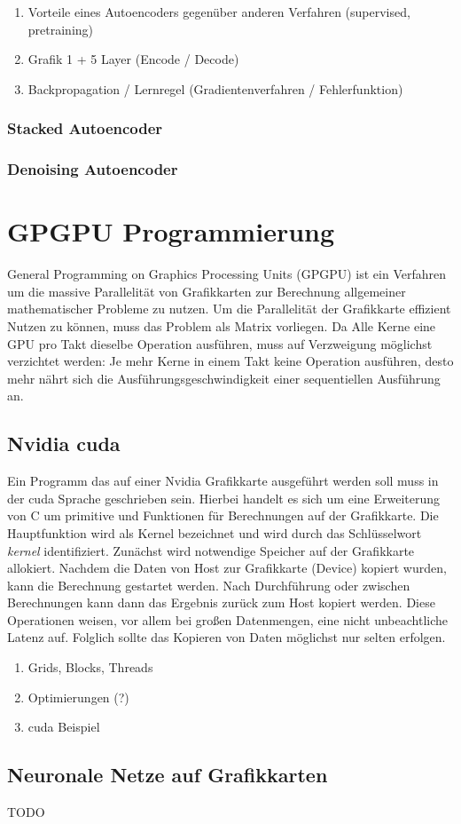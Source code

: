 \begin{enumerate}
	\item Vorteile eines Autoencoders gegenüber anderen Verfahren (supervised, pretraining)
	\item Grafik 1 + 5 Layer (Encode / Decode)
	\item Backpropagation / Lernregel (Gradientenverfahren / Fehlerfunktion)
\end{enumerate}

\cite{ssn1997}

\subsubsection{Stacked Autoencoder}

\subsubsection{Denoising Autoencoder}

\section{GPGPU Programmierung}

General Programming on Graphics Processing Units (GPGPU) ist ein Verfahren um die massive Parallelität von Grafikkarten zur Berechnung allgemeiner mathematischer Probleme zu nutzen. Um die Parallelität der Grafikkarte effizient Nutzen zu können, muss das Problem als Matrix vorliegen. Da Alle Kerne eine GPU pro Takt dieselbe Operation ausführen, muss auf Verzweigung möglichst verzichtet werden: Je mehr Kerne  in einem Takt keine Operation ausführen, desto mehr nährt sich die Ausführungsgeschwindigkeit einer sequentiellen Ausführung an.

\subsection{Nvidia cuda}

Ein Programm das auf einer Nvidia Grafikkarte ausgeführt werden soll muss in der cuda Sprache geschrieben sein. Hierbei handelt es sich um eine Erweiterung von C um primitive und Funktionen für Berechnungen auf der Grafikkarte. Die Hauptfunktion wird als Kernel bezeichnet und wird durch das Schlüsselwort \textit{\textunderscore\textunderscore kernel\textunderscore\textunderscore} identifiziert. Zunächst wird notwendige Speicher auf der Grafikkarte allokiert. Nachdem die Daten von Host zur Grafikkarte (Device) kopiert wurden, kann die Berechnung gestartet werden. Nach Durchführung oder zwischen Berechnungen kann dann das Ergebnis zurück zum Host kopiert werden. Diese Operationen weisen, vor allem bei großen Datenmengen, eine nicht unbeachtliche Latenz auf. Folglich sollte das Kopieren von Daten möglichst nur selten erfolgen.

\begin{enumerate}
	\item Grids, Blocks, Threads
	\item Optimierungen (?)
	\item cuda Beispiel
\end{enumerate}

\subsection{Neuronale Netze auf Grafikkarten}

TODO